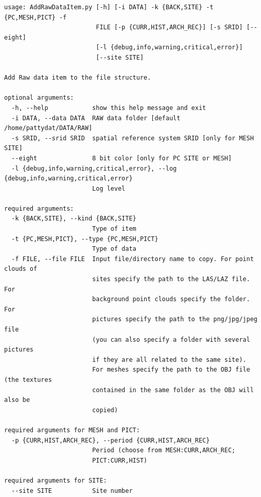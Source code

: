 \begin{Verbatim}[fontfamily=courier,commandchars=\\\{\},fontsize=\footnotesize]
usage: AddRawDataItem.py [-h] [-i DATA] -k {BACK,SITE} -t {PC,MESH,PICT} -f
                         FILE [-p {CURR,HIST,ARCH_REC}] [-s SRID] [--eight]
                         [-l {debug,info,warning,critical,error}]
                         [--site SITE]

Add Raw data item to the file structure.

optional arguments:
  -h, --help            show this help message and exit
  -i DATA, --data DATA  RAW data folder [default /home/pattydat/DATA/RAW]
  -s SRID, --srid SRID  spatial reference system SRID [only for MESH SITE]
  --eight               8 bit color [only for PC SITE or MESH]
  -l {debug,info,warning,critical,error}, --log {debug,info,warning,critical,error}
                        Log level

required arguments:
  -k {BACK,SITE}, --kind {BACK,SITE}
                        Type of item
  -t {PC,MESH,PICT}, --type {PC,MESH,PICT}
                        Type of data
  -f FILE, --file FILE  Input file/directory name to copy. For point clouds of
                        sites specify the path to the LAS/LAZ file. For
                        background point clouds specify the folder. For
                        pictures specify the path to the png/jpg/jpeg file 
                        (you can also specify a folder with several pictures 
                        if they are all related to the same site). 
                        For meshes specify the path to the OBJ file (the textures
                        contained in the same folder as the OBJ will also be
                        copied)

required arguments for MESH and PICT:
  -p {CURR,HIST,ARCH_REC}, --period {CURR,HIST,ARCH_REC}
                        Period (choose from MESH:CURR,ARCH_REC;
                        PICT:CURR,HIST)

required arguments for SITE:
  --site SITE           Site number
\end{Verbatim}

